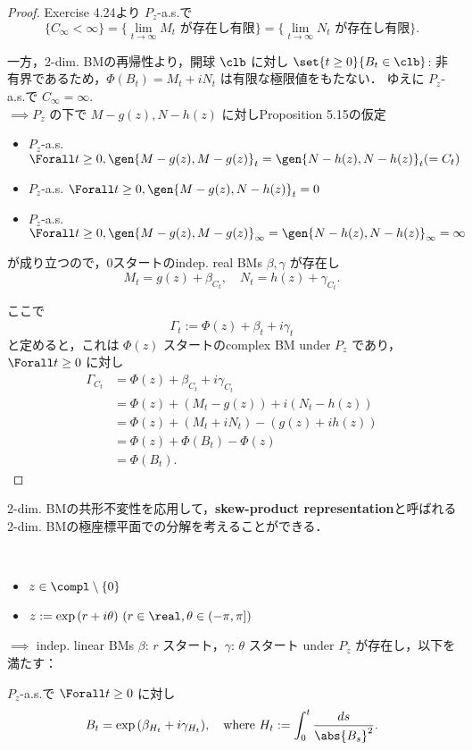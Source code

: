 \documentclass{jsarticle}
\begin{document}
\begin{proof}
    Exercise 4.24より $P_z$-a.s.で
    $$
    \{C_\infty<\infty\}
    = \{\lim_{t\to\infty}M_t\text{ が存在し有限}\}
    = \{\lim_{t\to\infty}N_t\text{ が存在し有限}\}.
    $$
    
    一方，2-dim. BMの再帰性より，開球 $\clb$ に対し $\set{t\ge0}{B_t\in\clb}$: 非有界であるため，$\Phi(B_t)=M_t+iN_t$ は有限な極限値をもたない．
    ゆえに $P_z$-a.s.で $C_\infty=\infty.$ \\
    $\implies P_z$ の下で $M-g(z), N-h(z)$ に対しProposition 5.15の仮定
    \begin{itemize}
        \item 
        $P_z$-a.s. $\Forall t\ge0, \gen{M-g(z), M-g(z)}_t=\gen{N-h(z), N-h(z)}_t(=C_t)$
        \item 
        $P_z$-a.s. $\Forall t\ge0, \gen{M-g(z), N-h(z)}_t=0$
        \item 
        $P_z$-a.s. $\Forall t\ge0, \gen{M-g(z), M-g(z)}_{\infty}=\gen{N-h(z), N-h(z)}_{\infty}=\infty$
    \end{itemize}
    が成り立つので，0スタートのindep. real BMs $\beta, \gamma$ が存在し
    $$
    M_t=g(z)+\beta_{C_t},\quad
    N_t=h(z)+\gamma_{C_t}.
    $$

    ここで
    $$
    \Gamma_t
    := \Phi(z)+\beta_t+i\gamma_t
    $$
    と定めると，これは $\Phi(z)$ スタートのcomplex BM under $P_z$ であり，$\Forall t\ge0$ に対し
    \begin{align}
        \Gamma_{C_t}
        &= \Phi(z)+\beta_{C_t}+i\gamma_{C_t} \\
        &= \Phi(z)+(M_t-g(z))+i(N_t-h(z)) \\
        &= \Phi(z)+(M_t+iN_t)-(g(z)+ih(z)) \\
        &= \Phi(z)+\Phi(B_t)-\Phi(z) \\
        &= \Phi(B_t).
    \end{align}
\end{proof}

2-dim. BMの共形不変性を応用して，\textbf{skew-product representation}と呼ばれる2-dim. BMの極座標平面での分解を考えることができる．

\begin{screen}
    \begin{thm}\label{thm:719}~
        \begin{itemize}
            \item 
            $z\in\compl\setminus\{0\}$
            \item 
            $z:=\exp{(r+i\theta)}\ (r\in\real, \theta\in(-\pi, \pi])$
        \end{itemize}
        $\implies $ indep. linear BMs $\beta$: $r$ スタート，$\gamma$: $\theta$ スタート under $P_z$ が存在し，以下を満たす：
        
        $P_z$-a.s.で $\Forall t\ge0$ に対し
        $$
        B_t=\exp{(\beta_{H_t}+i\gamma_{H_t})},\quad
        \text{where }H_t:=\int_0^t\frac{ds}{\abs{B_s}^2}.
        $$
    \end{thm}
\end{screen}
\end{document}
